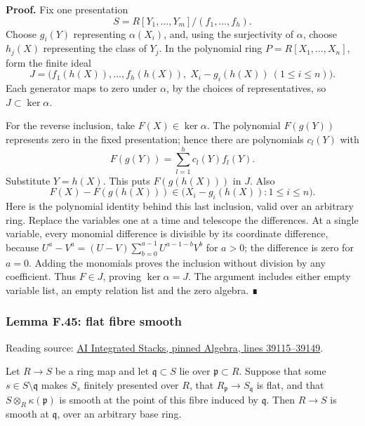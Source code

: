 \documentclass[11pt,a4paper,openany]{report}
\begin{document}
\textbf{Proof.} Fix one presentation \[
S=R[Y_1,\ldots,Y_m]/(f_1,\ldots,f_h).
\] Choose \(g_i(Y)\) representing \(\alpha(X_i)\), and, using the surjectivity of \(\alpha\), choose \(h_j(X)\) representing the class of \(Y_j\). In the polynomial ring \(P=R[X_1,\ldots,X_n]\), form the finite ideal \[
J=\bigl(f_1(h(X)),\ldots,f_h(h(X)),\;
X_i-g_i(h(X))\ (1\leq i\leq n)\bigr).
\] Each generator maps to zero under \(\alpha\), by the choices of representatives, so \(J\subset\ker\alpha\).

For the reverse inclusion, take \(F(X)\in\ker\alpha\). The polynomial \(F(g(Y))\) represents zero in the fixed presentation; hence there are polynomials \(c_l(Y)\) with \[
F(g(Y))=\sum_{l=1}^h c_l(Y)f_l(Y).
\] Substitute \(Y=h(X)\). This puts \(F(g(h(X)))\) in \(J\). Also \[
F(X)-F(g(h(X)))\in
\bigl(X_i-g_i(h(X)):1\leq i\leq n\bigr).
\] Here is the polynomial identity behind this last inclusion, valid over an arbitrary ring. Replace the variables one at a time and telescope the differences. At a single variable, every monomial difference is divisible by its coordinate difference, because \(U^a-V^a=(U-V)\sum_{b=0}^{a-1}U^{a-1-b}V^b\) for \(a>0\); the difference is zero for \(a=0\). Adding the monomials proves the inclusion without division by any coefficient. Thus \(F\in J\), proving \(\ker\alpha=J\). The argument includes either empty variable list, an empty relation list and the zero algebra. ∎

\label{AG-RG-S05-algebra-lemma-flat-fibre-smooth}

\subsubsection{Lemma F.45: flat fibre smooth}\label{AG-RG-S05-lemma-f.45-flat-fibre-smooth}

Reading source: \href{https://github.com/KokunoYumeto/unofficial-stacks-project-ai-drafts/blob/565b10e987aba5969b21145a0833f42d69f96790/algebra.tex\#L39115-L39149}{AI Integrated Stacks, pinned Algebra, lines 39115--39149}.

Let \(R\to S\) be a ring map and let \(\mathfrak q\subset S\) lie over \(\mathfrak p\subset R\). Suppose that some \(s\in S\setminus\mathfrak q\) makes \(S_s\) finitely presented over \(R\), that \(R_{\mathfrak p}\to S_{\mathfrak q}\) is flat, and that \(S\otimes_R\kappa(\mathfrak p)\) is smooth at the point of this fibre induced by \(\mathfrak q\). Then \(R\to S\) is smooth at \(\mathfrak q\), over an arbitrary base ring.
\end{document}
